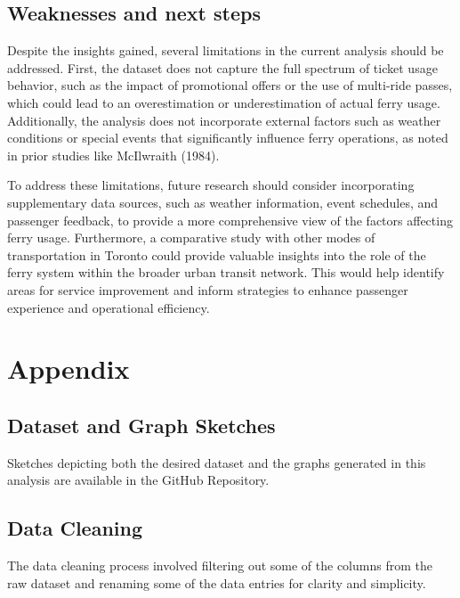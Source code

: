 \documentclass[
  letterpaper,
  DIV=11,
  numbers=noendperiod]{scrartcl}
\begin{document}
\subsection{Weaknesses and next steps}\label{weaknesses-and-next-steps}

Despite the insights gained, several limitations in the current analysis
should be addressed. First, the dataset does not capture the full
spectrum of ticket usage behavior, such as the impact of promotional
offers or the use of multi-ride passes, which could lead to an
overestimation or underestimation of actual ferry usage. Additionally,
the analysis does not incorporate external factors such as weather
conditions or special events that significantly influence ferry
operations, as noted in prior studies like McIlwraith (1984).

To address these limitations, future research should consider
incorporating supplementary data sources, such as weather information,
event schedules, and passenger feedback, to provide a more comprehensive
view of the factors affecting ferry usage. Furthermore, a comparative
study with other modes of transportation in Toronto could provide
valuable insights into the role of the ferry system within the broader
urban transit network. This would help identify areas for service
improvement and inform strategies to enhance passenger experience and
operational efficiency.

\newpage

\appendix

\section{Appendix}\label{sec-appendix}

\subsection{Dataset and Graph Sketches}\label{sec-appendix-sketches}

Sketches depicting both the desired dataset and the graphs generated in
this analysis are available in the GitHub Repository.

\subsection{Data Cleaning}\label{sec-appendix-cleaning}

The data cleaning process involved filtering out some of the columns
from the raw dataset and renaming some of the data entries for clarity
and simplicity.
\end{document}
